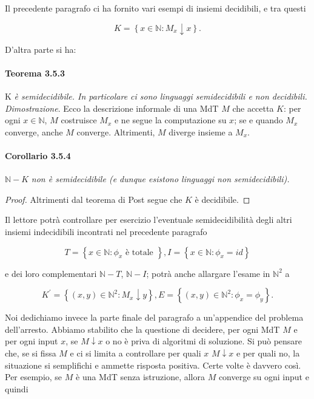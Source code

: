 Il precedente paragrafo ci ha fornito vari esempi di insiemi decidibili, e tra
questi

\[
    K=\left\{x \in \mathbb{N}: M_x \downarrow x\right\} .
\]

D'altra parte si ha:

\paragraph{Teorema 3.5.3} $\mathrm{K}$ \textit{è semidecidibile. In particolare
    ci sono linguaggi semidecidibili e non decidibili.}\\

\textit{Dimostrazione}. Ecco la descrizione informale di una MdT $M$ che accetta
$K$: per ogni $x \in \mathbb{N}$, $M$ costruisce $M_x$ e ne segue la computazione
su $x$; se e quando $M_x$ converge, anche $M$ converge. Altrimenti, $M$ diverge
insieme a $M_x$.

\paragraph{Corollario 3.5.4} $\mathbb{N}-K$ \textit{non è semidecidibile (e dunque esistono
    linguaggi non semidecidibili).}

\begin{proof}
    Altrimenti dal teorema di Post segue che $K$ è decidibile.
\end{proof}

Il lettore potrà controllare per esercizio
l'eventuale semidecidibilità degli altri insiemi indecidibili incontrati nel
precedente paragrafo

\[
    T=\left\{x \in \mathbb{N}: \phi_x \text { è totale }\right\}, I=\left\{x \in \mathbb{N}: \phi_x=i d\right\}
\]

e dei loro complementari $\mathbb{N}-T$, $\mathbb{N}-I$; potrà anche allargare
l'esame in $\mathbb{N}^2$ a

\[
    K^{\prime}=\left\{(x, y) \in \mathbb{N}^2: M_x \downarrow y\right\}, E=\left\{(x, y) \in \mathbb{N}^2: \phi_x=\phi_y\right\} .
\]

Noi dedichiamo invece la parte finale del paragrafo a un'appendice del problema
dell'arresto. Abbiamo stabilito che la questione di decidere, per ogni MdT $M$ e
per ogni input $x$, se $M \downarrow x$ o no è priva di algoritmi di soluzione.
Si può pensare che, se si fissa $M$ e ci si limita a controllare per quali $x$ $M
    \downarrow x$ e per quali no, la situazione si semplifichi e ammette risposta
positiva. Certe volte è davvero così. Per esempio, se $M$ è una MdT senza
istruzione, allora $M$ converge su ogni input e quindi

